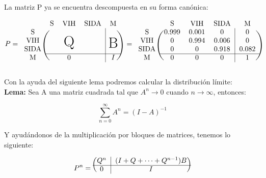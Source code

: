 \documentclass[11pt]{article}
\def\Big#1{\makebox(0,0){\huge#1}}
\begin{document}
La matriz P ya se encuentra descompuesta en su forma canónica:

\begin{equation*}
  P = 
  \begin{blockarray}{ccccc}
    & \text{S} & \text{VIH} & \text{SIDA} & \text{M} \\
   \begin{block}{c(ccc|c)}
     \text{S}    & & & & \\
     \text{VIH}  & & \Big{Q} & & \Big{B} \\
     \text{SIDA} & & & & \\
     \cline{2-5}
     \text{M}    & & 0 & & I \\
   \end{block}
  \end{blockarray}
  \;\; =
  \begin{blockarray}{ccccc}
     & \text{S} & \text{VIH} & \text{SIDA} & \text{M} \\
    \begin{block}{c(ccc|c)}
      \text{S}    & 0.999 & 0.001 & 0     & 0 \\
      \text{VIH}  & 0     & 0.994 & 0.006 & 0 \\
      \text{SIDA} & 0     & 0     & 0.918 & 0.082 \\
      \cline{2-5}
      \text{M}    & 0     & 0     & 0     & 1 \\
    \end{block}
  \end{blockarray}
\end{equation*}

Con la ayuda del siguiente lema podremos calcular la distribución límite: \\

\textbf{Lema:} Sea A una matriz cuadrada tal que $ A^n \rightarrow 0 $ cuando
$ n \rightarrow \infty $, entonces:

\begin{equation*}
  \sum_{n = 0}^{\infty} A^n = (I - A)^{-1}
\end{equation*}

Y ayudándonos de la multiplicación por bloques de matrices, tenemos lo siguiente:

\begin{equation*}
  P^n = 
  \begin{blockarray}{cc}
   \begin{block}{(c|c)}
    Q^n & (I + Q + \dots + Q^{n-1})B \\
    \cline{1-2}
    0 & I \\
   \end{block}
  \end{blockarray}
\end{equation*}
\end{document}

